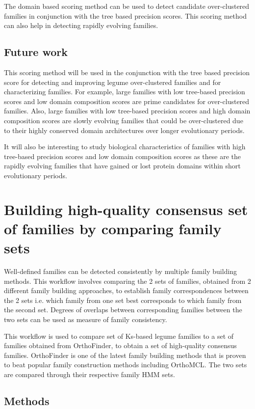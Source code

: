 \documentclass{article}
\begin{document}
	The domain based scoring method can be used to detect candidate over-clustered families in conjunction with the tree based precision scores. This scoring method can also help in detecting rapidly evolving families.
	
	\subsection{Future work}
	This scoring method will be used in the conjunction with the tree based precision score for detecting and improving  legume over-clustered families and for characterizing families. For example,  large families with low tree-based precision scores and low domain composition scores are prime candidates for over-clustered families. Also, large families with low tree-based precision scores and high domain composition scores are slowly evolving families that could be over-clustered due to their highly conserved domain architectures over longer evolutionary periods.
	
	It will also be interesting to study biological characteristics of families with high tree-based precision scores and low domain composition scores as these are the rapidly evolving families that have gained or lost protein domains within short evolutionary periods.
	

	\section{Building high-quality consensus set of families by comparing family sets}
	Well-defined families can be detected consistently by multiple family building methods.  
	This workflow involves comparing the 2 sets of families, obtained from 2 different family building approaches, to establish family correspondences between the 2 sets i.e. which family from one set best corresponds to which family from the second set. Degrees of overlaps between corresponding families between the two sets can be used as measure of family consistency.
	
	This workflow is used to compare set of Ks-based legume families to a set of families obtained from OrthoFinder, to obtain a set of high-quality consensus families. OrthoFinder is one of the latest family building methods that is proven to beat popular family construction methods including OrthoMCL. The two sets are compared through their respective family HMM sets.
	
		\subsection{Methods}
\end{document}
